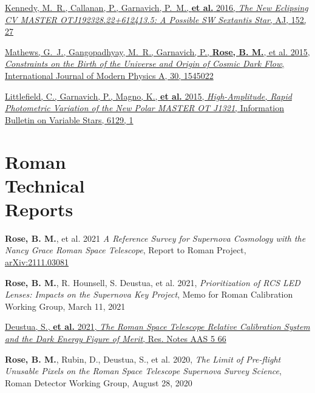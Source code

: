 \documentclass[margin]{res}
\begin{document}
\begin{resume}
\vspace{-12pt}
\hangindent=15pt 
\href{https://ui.adsabs.harvard.edu/#abs/2016AJ....152...27K/abstract}{Kennedy, M.~R., Callanan, P., Garnavich, P.~M., {\bf et al.} 2016, {\sl The New Eclipsing CV MASTER OTJ192328.22+612413.5: A Possible SW Sextantis Star}, AJ, 152, 27}

\vspace{-12pt}
\hangindent=15pt 
\href{https://ui.adsabs.harvard.edu/#abs/2015IJMPA..3045022M/abstract}{Mathews, G.~J., Gangopadhyay, M.~R., Garnavich, P., {\bf Rose, B. M.}, et al. 2015, {\sl Constraints on the Birth of the Universe and Origin of Cosmic Dark Flow}, International Journal of Modern Physics A, 30, 1545022}

\vspace{-12pt}
\hangindent=15pt 
\href{https://ui.adsabs.harvard.edu/#abs/2015IBVS.6129....1L/abstract}{Littlefield, C., Garnavich, P., Magno, K., {\bf et al.} 2015, {\sl High-Amplitude, Rapid Photometric Variation of the New Polar MASTER OT J1321}, Information Bulletin on Variable Stars, 6129, 1}

\section{Roman\\Technical\\Reports}

\hangindent=15pt
\textbf{Rose, B. M.}, et al. 2021 {\sl A Reference Survey for Supernova Cosmology with the Nancy Grace Roman Space Telescope}, Report to Roman Project,
\href{https://arxiv.org/abs/2111.03081}{arXiv:2111.03081}
\vspace{-12pt}

\hangindent=15pt 
\textbf{Rose, B. M.},  R. Hounsell,  S. Deustua,  et al. 2021, {\sl Prioritization of RCS LED Lenses: Impacts on the Supernova Key Project}, Memo for Roman Calibration Working Group, March 11, 2021
\vspace{-12pt}

\hangindent=15pt 
\href{iopscience.iop.org/article/10.3847/2515-5172/abf1fb}{Deustua, S., \textbf{et al.} 2021, {\sl The Roman Space Telescope Relative Calibration System and the Dark Energy Figure of Merit}, Res. Notes AAS 5 66}
\vspace{-12pt}

\hangindent=15pt 
\textbf{Rose, B. M.}, Rubin, D., Deustua, S., et al. 2020, {\sl The Limit of Pre-flight Unusable Pixels on the Roman Space Telescope Supernova Survey Science}, Roman Detector Working Group, August 28, 2020
\vspace{-12pt}


\end{resume}
\end{document}

